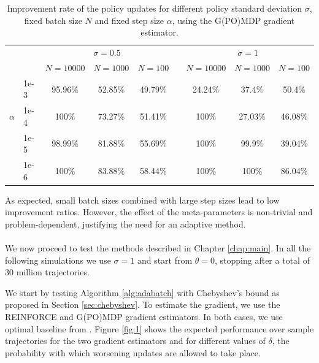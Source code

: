 \begin{table}[H]
\label{tab:1}
\caption{Improvement rate of the policy updates for different policy standard deviation $\sigma$, fixed batch size $N$ and fixed step size $\alpha$, using the G(PO)MDP gradient estimator.}
\centering
\begin{adjustbox}{right}
\begin{tabular}{@{}llccccccc@{}} 
\toprule
\phantom{abc} & \phantom{abc} & \multicolumn{3}{c}{$\sigma=0.5$} & \phantom{abc} & \multicolumn{3}{c}{$\sigma=1$} \\
\cmidrule{3-5} \cmidrule{7-9}
\phantom{abc} & \phantom{abc} & $N=10000$ & $N=1000$ & $N=100$ & \phantom{abc} & $N=10000$ & $N=1000$ & $N=100$
\\\cmidrule{3-9}
\phantom{abc} & 1e-3 & 95.96\% & 52.85\% & 49.79\% & \phantom{abc} & 24.24\% & 37.4\% & 50.4\% \\ 
 $\alpha$	  & 1e-4 & 100\% & 73.27\% & 51.41\% & \phantom{abc} & 100\% & 27.03\% & 46.08\% \\
\phantom{abc} & 1e-5 & 98.99\% & 81.88\% & 55.69\% & \phantom{abc} & 100\% & 99.9\% & 39.04\%\\
\phantom{abc} & 1e-6 & 100\% & 83.88\% & 58.44\% & \phantom{abc} & 100\% & 100\% & 86.04\% \\
\bottomrule
\end{tabular}
\end{adjustbox}
\end{table}

As expected, small batch sizes combined with large step sizes lead to low improvement ratios. However, the effect of the meta-parameters is non-trivial and problem-dependent, justifying the need for an adaptive method.  
\paragraph{}
We now proceed to test the methods described in Chapter \ref{chap:main}. 
In all the following simulations we use $\sigma = 1$ and start from $\theta=0$, stopping after a total of 30 million trajectories.

We start by testing Algorithm \ref{alg:adabatch} with Chebyshev's bound as proposed in Section \ref{sec:chebyshev}. To estimate the gradient, we use the REINFORCE and G(PO)MDP gradient estimators. In both cases, we use optimal baseline from \cite{4867}.
Figure \ref{fig:1} shows the expected performance over sample trajectories for the two gradient estimators and for different values of $\delta$, the probability with which worsening updates are allowed to take place.


